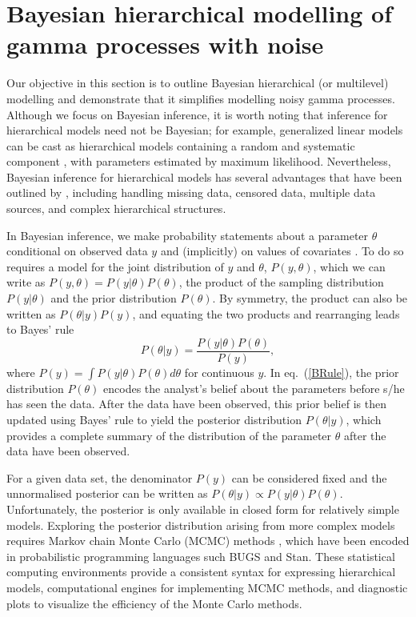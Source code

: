 \documentclass{article}
\begin{document}
\section{Bayesian hierarchical modelling of gamma processes with noise}\label{sec:BHM_noisyGP}

Our objective in this section is to outline Bayesian hierarchical (or multilevel) modelling and demonstrate that it simplifies modelling noisy gamma processes. Although we focus on Bayesian inference, it is worth noting that inference for hierarchical models need not be Bayesian; for example, generalized linear models can be cast as hierarchical models containing a random and systematic component \citet[Section~5.6]{dunn2018}, with parameters estimated by maximum likelihood. Nevertheless, Bayesian inference for hierarchical models has several advantages that have been outlined by \citet{reich2019}, including handling missing data, censored data, multiple data sources, and complex hierarchical structures.

In Bayesian inference, we make probability statements about a parameter $\theta$ conditional on observed data $y$ and (implicitly) on values of covariates \citep{gelman2013bayesian}.  To do so requires a model for the joint distribution of $y$ and $\theta$, $P(y, \theta)$, which we can write as $P(y, \theta) = P(y|\theta) P(\theta)$, the product of the sampling distribution $P(y | \theta)$ and the prior distribution $P(\theta)$. By symmetry, the product can also be written as $P(\theta|y) P(y)$, and equating the two products and rearranging leads to Bayes' rule
\begin{equation} \label{BRule}
    P(\theta|y) = \frac{P(y|\theta)P(\theta)}{P(y)},
\end{equation}
where $P(y) = \int P(y|\theta) P(\theta) d\theta$ for continuous $y$.  In eq.~(\ref{BRule}), the prior distribution $P(\theta)$ encodes the analyst's belief about the parameters before s/he has seen the data. After the data have been observed, this prior belief is then updated using Bayes' rule to yield the posterior distribution $P(\theta|y)$, which provides a complete summary of the distribution of the parameter $\theta$ after the data have been observed.

For a given data set, the denominator $P(y)$ can be considered fixed and the unnormalised posterior can be written as $P(\theta|y) \propto P(y|\theta)P(\theta)$. Unfortunately, the posterior is only available in closed form for relatively simple models. Exploring the posterior distribution arising from more complex models requires Markov chain Monte Carlo (MCMC) methods \citep{gilks1996markov}, which have been encoded in probabilistic programming languages such BUGS\citep{Lunn_2012} and Stan\citep{Stan_2022}. These statistical computing environments provide a consistent syntax for expressing hierarchical models, computational engines for implementing MCMC methods, and diagnostic plots to visualize the efficiency of the Monte Carlo methods. 
\end{document}
